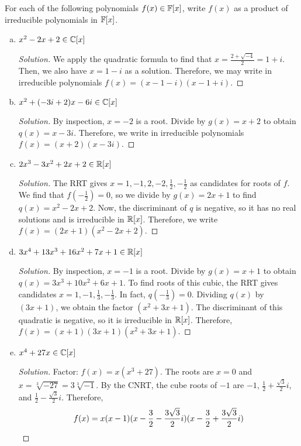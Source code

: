 \documentclass{agony}
\begin{document}
\question For each of the following polynomials $f(x) \in \mathbb{F}[x]$,
write $f(x)$ as a product of irreducible polynomials in $\mathbb{F}[x]$.
\begin{enumerate}[(a)]
  \item $x^2 - 2x + 2 \in \mathbb{C}[x]$
        \begin{proof}[Solution]
          We apply the quadratic formula to find that $x = \frac{2+\sqrt{-4}}{2} = 1+i$.
          Then, we also have $x = 1-i$ as a solution.
          Therefore, we may write in irreducible polynomials $f(x)=(x-1-i)(x-1+i)$.
        \end{proof}
  \item $x^2 + (-3i + 2)x - 6i \in \mathbb{C}[x]$
        \begin{proof}[Solution]
          By inspection, $x=-2$ is a root.
          Divide by $g(x)=x+2$ to obtain $q(x)=x-3i$.
          Therefore, we write in irreducible polynomials $f(x)=(x+2)(x-3i)$.
        \end{proof}
  \item $2x^3 - 3x^2 + 2x + 2 \in \mathbb{R}[x]$
        \begin{proof}[Solution]
          The RRT gives $x=1,-1,2,-2,\frac12,-\frac12$ as candidates for roots of $f$.
          We find that $f(-\frac12)=0$, so we divide by $g(x)=2x+1$ to find $q(x)=x^2-2x+2$.
          Now, the discriminant of $q$ is negative, so it has no real solutions and is irreducible in $\mathbb{R}[x]$.
          Therefore, we write $f(x)=(2x+1)(x^2-2x+2)$.
        \end{proof}
  \item $3x^4 + 13x^3 + 16x^2 + 7x + 1 \in \mathbb{R}[x]$
        \begin{proof}[Solution]
          By inspection, $x=-1$ is a root.
          Divide by $g(x)=x+1$ to obtain $q(x)=3x^3+10x^2+6x+1$.
          To find roots of this cubic, the RRT gives candidates $x=1,-1,\frac13,-\frac13$.
          In fact, $q(-\frac13)=0$.
          Dividing $q(x)$ by $(3x+1)$, we obtain the factor $(x^2+3x+1)$.
          The discriminant of this quadratic is negative, so it is irreducible in $\mathbb{R}[x]$.
          Therefore, $f(x) = (x+1)(3x+1)(x^2+3x+1)$.
        \end{proof}
  \item $x^4 + 27x \in \mathbb{C}[x]$
        \begin{proof}[Solution]
          Factor: $f(x) = x(x^3 + 27)$.
          The roots are $x=0$ and $x=\sqrt[3]{-27}=3\sqrt[3]{-1}$.
          By the CNRT, the cube roots of $-1$ are $-1$,
          $\frac12+\frac{\sqrt{3}}2i$, and $\frac12-\frac{\sqrt{3}}2i$. Therefore,
          \[ f(x) = x(x-1)(x-\frac{3}{2}-\frac{3\sqrt{3}}{2}i)(x-\frac{3}{2}+\frac{3\sqrt{3}}{2}i) \qedhere \]
        \end{proof}
\end{enumerate}
\end{document}
